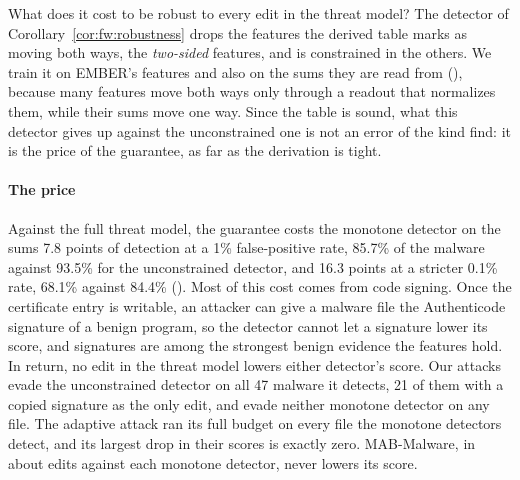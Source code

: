 What does it cost to be robust to every edit in the threat model? The detector of Corollary~\ref{cor:fw:robustness}
drops the features the derived table marks as moving both ways, the \emph{two-sided} features, and is constrained in
the others. We train it on EMBER's features and also on the sums they are read from (),
because many features move both ways only through a readout that normalizes them, while their sums move one way.
Since the table is sound, what this detector gives up against the unconstrained one is not an error of the kind
 find: it is the price of the guarantee, as far as the derivation is tight.

\paragraph{The price}
Against the full threat model, the guarantee costs the monotone detector on the sums 7.8 points of detection at a 1\%
false-positive rate, 85.7\% of the malware against 93.5\% for the unconstrained detector, and 16.3 points at a stricter
0.1\% rate, 68.1\% against 84.4\% (). Most of this cost comes from code signing. Once the certificate entry is writable, an attacker can give a
malware file the Authenticode signature of a benign program, so the detector cannot let a signature lower its score, and signatures are among the strongest benign evidence the features
hold. In return, no edit in the threat model lowers either detector's score. Our attacks evade the unconstrained
detector on all 47 malware it detects, 21 of them with a copied signature as the only edit, and evade neither monotone
detector on any file. The adaptive attack ran its full budget on every file the monotone detectors detect, and its
largest drop in their scores is exactly zero. MAB-Malware, in about  edits against each monotone
detector, never lowers its score.

